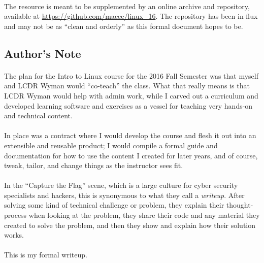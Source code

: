 \documentclass[11pt]{article}
\begin{document}
	\paragraph{} The resource is meant to be supplemented by an online archive and repository, available at \href{https://github.com/macee/linux_16}{https://github.com/macee/linux\_16}. The repository has been in flux and may not be as ``clean and orderly'' as this formal document hopes to be.

	\subsection{Author's Note}
	\label{Authors_Note}
	
	\paragraph{} The plan for the Intro to Linux course for the 2016 Fall Semester was that myself and LCDR Wyman would ``co-teach'' the class. What that really means is that LCDR Wyman would help with admin work, while I carved out a curriculum and developed learning software and exercises as a vessel for teaching very hands-on and technical content.

	\paragraph{} In place was a contract where I would develop the course and flesh it out into an extensible and reusable product; I would compile a formal guide and documentation for how to use the content I created for later years, and of course, tweak, tailor, and change things as the instructor sees fit.

	\paragraph{} In the ``Capture the Flag'' scene, which is a large culture for cyber security specialists and hackers, this is synonymous to what they call a \textit{writeup}. After solving some kind of technical challenge or problem, they explain their thought-process when looking at the problem, they share their code and any material they created to solve the problem, and then they show and explain how their solution works. 

	\paragraph{} This is my formal writeup.
\end{document}

